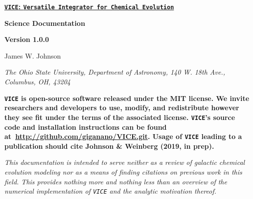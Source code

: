 \documentclass{report}
\begin{document}
\hypertarget{top}{}
\thispagestyle{empty}
\begin{center}
\underline{\LARGE
	\textbf{\texttt{VICE}: \texttt{Versatile Integrator for Chemical 
	Evolution}}
}
\par\null\par
{\LARGE \textbf{Science Documentation}}
\par\null\par
{\Large \textbf{Version 1.0.0}}
\par\null\par
{\Large
James W. Johnson 
} \par
\textit{The Ohio State University, Department of Astronomy, 140 W. 18th 
Ave., Columbus, OH, 43204}

\par\null\par\noindent
\textbf{\texttt{VICE} is open-source software released under the MIT license. 
We invite researchers and developers to use, modify, and redistribute however 
they see fit under the terms of the associated license. \texttt{VICE}'s source 
code and installation instructions can be found 
at~\url{http://github.com/giganano/VICE.git}. Usage of \texttt{VICE} leading 
to a publication should cite Johnson \& Weinberg (2019, in prep). }

\par\null\par\noindent 
\textit{This documentation is intended to serve neither as a review of 
galactic chemical evolution modeling nor as a means of finding citations on 
previous work in this field. This provides nothing more and nothing less than 
an overview of the numerical implementation of \texttt{VICE} and the analytic 
motivation thereof.}
\end{center}
\end{document}
